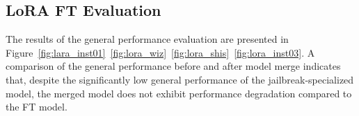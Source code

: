 \documentclass[conference,compsoc]{IEEEtran}
\begin{document}
\newpage

\subsection{LoRA FT Evaluation}
The results of the general performance evaluation are presented in Figure~\ref{fig:lara_inst01}~\ref{fig:lora_wiz}~\ref{fig:lora_shis}~\ref{fig:lora_inst03}.  
A comparison of the general performance before and after model merge indicates that, despite the significantly low general performance of the jailbreak-specialized model, the merged model does not exhibit performance degradation compared to the FT model.
\\
\end{document}
